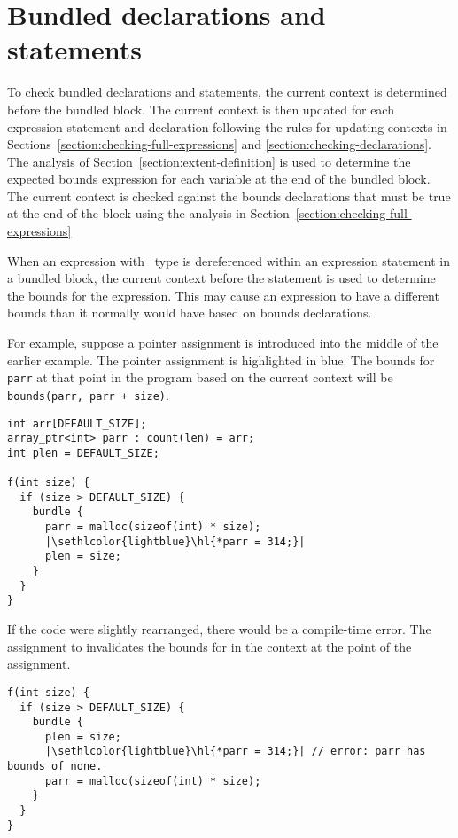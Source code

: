 \section{Bundled declarations and statements}
\label{section:checking-bundled}

To check bundled declarations and statements, the current context is
determined before the bundled block. The current context is then updated
for each expression statement and declaration following the rules for
updating contexts in Sections~\ref{section:checking-full-expressions} and 
\ref{section:checking-declarations}. The analysis of 
Section~\ref{section:extent-definition}
is used to determine the expected bounds expression for each variable at
the end of the bundled block. The current context is checked against the
bounds declarations that must be true at the end of the block using the
analysis in Section~\ref{section:checking-full-expressions}

When an expression with \arrayptr\ type is dereferenced within
an expression statement in a bundled block, the current context before
the statement is used to determine the bounds for the expression. This
may cause an expression to have a different bounds than it normally
would have based on bounds declarations.

For example, suppose a pointer assignment is introduced into the middle
of the earlier example. The pointer assignment is highlighted in blue.
The bounds for \lstinline|parr| at that point in the program based on the
current context will be \lstinline|bounds(parr, parr + size)|.

\begin{lstlisting}[escapechar=\|]
int arr[DEFAULT_SIZE];
array_ptr<int> parr : count(len) = arr;
int plen = DEFAULT_SIZE;

f(int size) {
  if (size > DEFAULT_SIZE) {
    bundle {
      parr = malloc(sizeof(int) * size);
      |\sethlcolor{lightblue}\hl{*parr = 314;}|
      plen = size;
    }
  }
}
\end{lstlisting}

If the code were slightly rearranged, there would be a compile-time
error. The assignment to  invalidates the bounds for
 in the context at the point of the assignment.

\begin{lstlisting}[escapechar=\|]
f(int size) {
  if (size > DEFAULT_SIZE) {
    bundle {
      plen = size;
      |\sethlcolor{lightblue}\hl{*parr = 314;}| // error: parr has bounds of none.
      parr = malloc(sizeof(int) * size);
    }
  }
}
\end{lstlisting}

